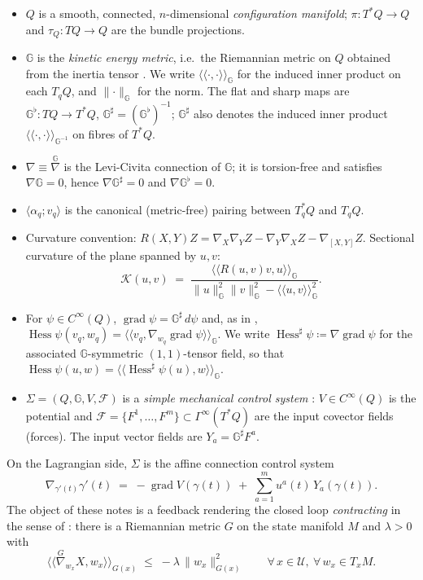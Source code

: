 \documentclass[11pt,a4paper]{article}
\newcommand{\Gm}{\mathbb{G}}                      %
\newcommand{\ip}[2]{\langle\!\langle #1 , #2 \rangle\!\rangle}
\newcommand{\ipG}[2]{\langle\!\langle #1 , #2 \rangle\!\rangle_{\Gm}}
\newcommand{\dpair}[2]{\langle #1 ; #2 \rangle}   %
\newcommand{\Gsharp}{\Gm^{\sharp}}
\newcommand{\Gflat}{\Gm^{\flat}}
\newcommand{\Hess}{\operatorname{Hess}}
\newcommand{\grad}{\operatorname{grad}}
\newcommand{\Sect}{\mathcal{K}}
\newcommand{\Gsec}[1]{\Gamma^{\infty}(#1)}
\newcommand{\Cinf}[1]{C^{\infty}(#1)}
\newcommand{\norm}[1]{\lVert #1 \rVert}
\newcommand{\normG}[1]{\lVert #1 \rVert_{\Gm}}
\newcommand{\Tstar}{T^{*}Q}
\theoremstyle{plain}
\theoremstyle{definition}
\theoremstyle{remark}
\begin{document}
\begin{itemize}[leftmargin=1.6em,itemsep=2pt]
\item $Q$ is a smooth, connected, $n$-dimensional \emph{configuration manifold};
      $\pi : \Tstar \to Q$ and $\tau_Q : TQ \to Q$ are the bundle projections.
\item $\Gm$ is the \emph{kinetic energy metric}, i.e.\ the Riemannian metric on
      $Q$ obtained from the inertia tensor \cite[\S4.2.3]{BL04}. We write
      $\ipG{\cdot}{\cdot}$ for the induced inner product on each $T_qQ$, and
      $\normG{\cdot}$ for the norm. The flat and sharp maps are
      $\Gflat : TQ \to \Tstar$, $\Gsharp = (\Gflat)^{-1}$; $\Gsharp$ also denotes
      the induced inner product $\ip{\cdot}{\cdot}_{\Gm^{-1}}$ on fibres of
      $\Tstar$.
\item $\nabla \equiv \overset{\Gm}{\nabla}$ is the Levi-Civita connection of
      $\Gm$; it is torsion-free and satisfies $\nabla\Gm = 0$, hence
      $\nabla\Gsharp = 0$ and $\nabla\Gflat = 0$.
\item $\dpair{\alpha_q}{v_q}$ is the canonical (metric-free) pairing between
      $T^{*}_qQ$ and $T_qQ$.
\item Curvature convention:
      $R(X,Y)Z = \nabla_X\nabla_Y Z - \nabla_Y\nabla_X Z - \nabla_{[X,Y]}Z$.
      Sectional curvature of the plane spanned by $u,v$:
      \[
        \Sect(u,v) \;=\;
        \frac{\ipG{R(u,v)v}{u}}{\normG{u}^2\normG{v}^2 - \ipG{u}{v}^2}.
      \]
\item For $\psi \in \Cinf{Q}$, $\grad\psi = \Gsharp\,d\psi$ and, as in
      \cite[\S5]{SB13},
      $\Hess\psi(v_q,w_q) = \ip{v_q}{\nabla_{w_q}\grad\psi}_{\Gm}$. We write
      $\Hess^{\sharp}\psi \coloneqq \nabla\grad\psi$ for the associated
      $\Gm$-symmetric $(1,1)$-tensor field, so that
      $\Hess\psi(u,w) = \ipG{\Hess^{\sharp}\psi(u)}{w}$.
\item $\Sigma = (Q,\Gm,V,\mathcal{F})$ is a \emph{simple mechanical control
      system} \cite[\S4.6.2]{BL04}: $V \in \Cinf{Q}$ is the potential and
      $\mathcal{F} = \{F^1,\dots,F^m\} \subset \Gsec{\Tstar}$ are the input
      covector fields (forces). The input vector fields are
      $Y_a = \Gsharp F^a$.
\end{itemize}

On the Lagrangian side, $\Sigma$ is the affine connection control system
\cite[\S4.6.3]{BL04}
\begin{equation}
  \nabla_{\gamma'(t)}\gamma'(t)
  \;=\; -\grad V(\gamma(t)) \;+\; \sum_{a=1}^{m} u^a(t)\, Y_a(\gamma(t)).
  \label{eq:accs}
\end{equation}
The object of these notes is a feedback rendering the closed loop
\emph{contracting} in the sense of \cite[Def.~2.1]{SB13}: there is a Riemannian
metric $G$ on the state manifold $M$ and $\lambda>0$ with
\begin{equation}
  \ip{\overset{G}{\nabla}_{w_x}X}{w_x}_{G(x)} \;\le\; -\lambda\,\norm{w_x}_{G(x)}^2
  \qquad \forall\, x \in \mathcal{U},\ \forall\, w_x \in T_xM .
  \label{eq:contraction}
\end{equation}
\end{document}
